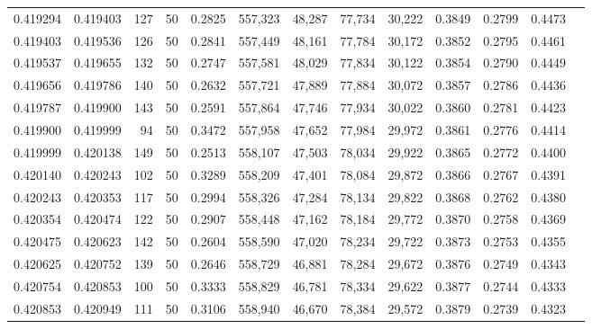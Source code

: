 \begin{tabular}{rrrrrrrrrrrrr}
0.419294 & 0.419403 &   127 &  50 &                                     0.2825 & 557,323 &  48,287 &  77,734 &  30,222 & 0.3849 & 0.2799 & 0.4473 \\
0.419403 & 0.419536 &   126 &  50 &                                     0.2841 & 557,449 &  48,161 &  77,784 &  30,172 & 0.3852 & 0.2795 & 0.4461 \\
0.419537 & 0.419655 &   132 &  50 &                                     0.2747 & 557,581 &  48,029 &  77,834 &  30,122 & 0.3854 & 0.2790 & 0.4449 \\
0.419656 & 0.419786 &   140 &  50 &                                     0.2632 & 557,721 &  47,889 &  77,884 &  30,072 & 0.3857 & 0.2786 & 0.4436 \\
0.419787 & 0.419900 &   143 &  50 &                                     0.2591 & 557,864 &  47,746 &  77,934 &  30,022 & 0.3860 & 0.2781 & 0.4423 \\
0.419900 & 0.419999 &    94 &  50 &                                     0.3472 & 557,958 &  47,652 &  77,984 &  29,972 & 0.3861 & 0.2776 & 0.4414 \\
0.419999 & 0.420138 &   149 &  50 &                                     0.2513 & 558,107 &  47,503 &  78,034 &  29,922 & 0.3865 & 0.2772 & 0.4400 \\
0.420140 & 0.420243 &   102 &  50 &                                     0.3289 & 558,209 &  47,401 &  78,084 &  29,872 & 0.3866 & 0.2767 & 0.4391 \\
0.420243 & 0.420353 &   117 &  50 &                                     0.2994 & 558,326 &  47,284 &  78,134 &  29,822 & 0.3868 & 0.2762 & 0.4380 \\
0.420354 & 0.420474 &   122 &  50 &                                     0.2907 & 558,448 &  47,162 &  78,184 &  29,772 & 0.3870 & 0.2758 & 0.4369 \\
0.420475 & 0.420623 &   142 &  50 &                                     0.2604 & 558,590 &  47,020 &  78,234 &  29,722 & 0.3873 & 0.2753 & 0.4355 \\
0.420625 & 0.420752 &   139 &  50 &                                     0.2646 & 558,729 &  46,881 &  78,284 &  29,672 & 0.3876 & 0.2749 & 0.4343 \\
0.420754 & 0.420853 &   100 &  50 &                                     0.3333 & 558,829 &  46,781 &  78,334 &  29,622 & 0.3877 & 0.2744 & 0.4333 \\
0.420853 & 0.420949 &   111 &  50 &                                     0.3106 & 558,940 &  46,670 &  78,384 &  29,572 & 0.3879 & 0.2739 & 0.4323 \\

\end{tabular}
